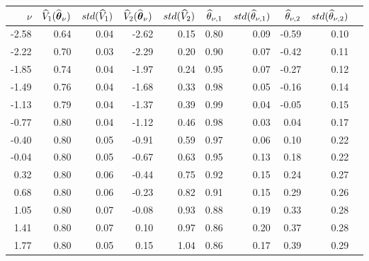 \begin{tabular}{rrrrrrrrrr}\hline 
$\nu$  & $\widehat{V}_1(\widehat{\boldsymbol{\theta}}_{\nu})$ & $std(\widehat{V}_1)$ & $\widehat{V}_2(\widehat{\boldsymbol{\theta}}_{\nu})$ & $std(\widehat{V}_2)$ & $\widehat{\theta}_{\nu,1}$ & $std(\widehat{\theta}_{\nu,1})$ & $\widehat{\theta}_{\nu,2}$ & $std(\widehat{\theta}_{\nu,2})$ \\ \hline 
-2.58 &     0.64 &     0.04  &    -2.62 &      0.15 &      0.80 &      0.09 &     -0.59 &      0.10 \\ 
-2.22 &     0.70 &     0.03  &    -2.29 &      0.20 &      0.90 &      0.07 &     -0.42 &      0.11 \\ 
-1.85 &     0.74 &     0.04  &    -1.97 &      0.24 &      0.95 &      0.07 &     -0.27 &      0.12 \\ 
-1.49 &     0.76 &     0.04  &    -1.68 &      0.33 &      0.98 &      0.05 &     -0.16 &      0.14 \\ 
-1.13 &     0.79 &     0.04  &    -1.37 &      0.39 &      0.99 &      0.04 &     -0.05 &      0.15 \\ 
-0.77 &     0.80 &     0.04  &    -1.12 &      0.46 &      0.98 &      0.03 &      0.04 &      0.17 \\ 
-0.40 &     0.80 &     0.05  &    -0.91 &      0.59 &      0.97 &      0.06 &      0.10 &      0.22 \\ 
-0.04 &     0.80 &     0.05  &    -0.67 &      0.63 &      0.95 &      0.13 &      0.18 &      0.22 \\ 
 0.32 &     0.80 &     0.06  &    -0.44 &      0.75 &      0.92 &      0.15 &      0.24 &      0.27 \\ 
 0.68 &     0.80 &     0.06  &    -0.23 &      0.82 &      0.91 &      0.15 &      0.29 &      0.26 \\ 
 1.05 &     0.80 &     0.07  &    -0.08 &      0.93 &      0.88 &      0.19 &      0.33 &      0.28 \\ 
 1.41 &     0.80 &     0.07  &     0.10 &      0.97 &      0.86 &      0.20 &      0.37 &      0.28 \\ 
 1.77 &     0.80 &     0.05  &     0.15 &      1.04 &      0.86 &      0.17 &      0.39 &      0.29 \\ 

\end{tabular}
